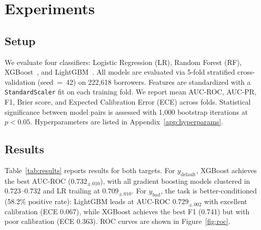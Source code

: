 \documentclass{article}
\begin{document}
\section{Experiments}

\subsection{Setup}

We evaluate four classifiers: Logistic Regression (LR), Random
Forest (RF), XGBoost~\cite{chen2016xgboost}, and
LightGBM~\cite{ke2017lightgbm}.
All models are evaluated via 5-fold stratified cross-validation
(seed~=~42) on 222,618 borrowers.
Features are standardized with a \texttt{StandardScaler} fit on each
training fold.
We report mean AUC-ROC, AUC-PR, F1, Brier score, and Expected
Calibration Error (ECE) across folds.
Statistical significance between model pairs is assessed with 1,000
bootstrap iterations at $p < 0.05$.
Hyperparameters are listed in Appendix~\ref{app:hyperparams}.

\subsection{Results}

Table~\ref{tab:results} reports results for both targets.
For $y_{\text{default}}$, XGBoost achieves the best AUC-ROC
($0.732_{\pm.010}$), with all gradient boosting models clustered in
$0.723$--$0.732$ and LR trailing at $0.709_{\pm.010}$.
For $y_{\text{bad}}$, the task is better-conditioned (58.2\% positive
rate): LightGBM leads at AUC-ROC $0.729_{\pm.002}$ with excellent
calibration (ECE 0.067), while XGBoost achieves the best F1 (0.741)
but with poor calibration (ECE 0.363).
ROC curves are shown in Figure~\ref{fig:roc}.
\end{document}
